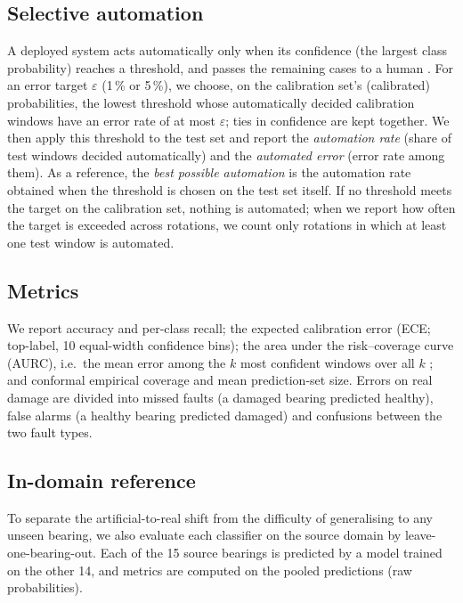 \subsection{Selective automation}
\label{sec:selective}

A deployed system acts automatically only when its confidence (the largest class probability) reaches a threshold,
and passes the remaining cases to a human \citep{geifman2017}. For an error target $\varepsilon$ (1\,\% or 5\,\%),
we choose, on the calibration set's (calibrated) probabilities, the lowest threshold whose automatically decided
calibration windows have an error rate of at most $\varepsilon$; ties in confidence are kept together. We then apply this threshold to the test set and report the
\emph{automation rate} (share of test windows decided automatically) and the \emph{automated error} (error rate among
them). As a reference, the \emph{best possible automation} is the automation rate obtained when the threshold is
chosen on the test set itself. If no threshold meets the target on the calibration set, nothing is automated; when we
report how often the target is exceeded across rotations, we count only rotations in which at least one test window
is automated.

\subsection{Metrics}

We report accuracy and per-class recall; the expected calibration error (ECE; top-label, 10 equal-width confidence
bins); the area under the risk--coverage curve (AURC), i.e.\ the mean error among the $k$ most confident windows over
all $k$ \citep{geifman2019}; and conformal empirical coverage and mean prediction-set size. Errors on real damage are
divided into missed faults (a damaged bearing predicted healthy), false alarms (a healthy bearing predicted damaged)
and confusions between the two fault types.

\subsection{In-domain reference}

To separate the artificial-to-real shift from the difficulty of generalising to any unseen bearing, we also evaluate
each classifier on the source domain by leave-one-bearing-out. Each of the 15 source bearings is predicted by a model
trained on the other 14, and metrics are computed on the pooled predictions (raw probabilities).

